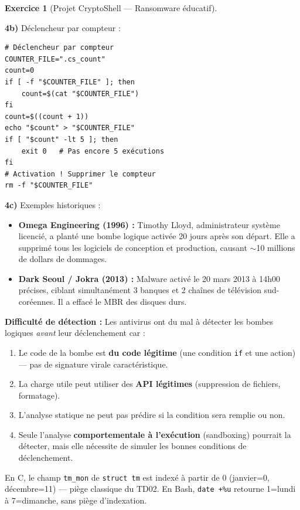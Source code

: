\documentclass[a4paper,11pt]{article}
\theoremstyle{plain}
\theoremstyle{definition}
\newtheorem{exercice}{Exercice}
\begin{document}
\begin{exercice}[Projet CryptoShell --- Ransomware éducatif]
\begin{correction}
\textbf{4b)} Déclencheur par compteur :
\begin{lstlisting}[title=Déclencheur par compteur]
# Déclencheur par compteur
COUNTER_FILE=".cs_count"
count=0
if [ -f "$COUNTER_FILE" ]; then
    count=$(cat "$COUNTER_FILE")
fi
count=$((count + 1))
echo "$count" > "$COUNTER_FILE"
if [ "$count" -lt 5 ]; then
    exit 0   # Pas encore 5 exécutions
fi
# Activation ! Supprimer le compteur
rm -f "$COUNTER_FILE"
\end{lstlisting}

\textbf{4c)} Exemples historiques :
\begin{itemize}
    \item \textbf{Omega Engineering (1996) :} Timothy Lloyd, administrateur système licencié, a planté une bombe logique activée 20 jours après son départ. Elle a supprimé tous les logiciels de conception et production, causant $\sim$10 millions de dollars de dommages.
    \item \textbf{Dark Seoul / Jokra (2013) :} Malware activé le 20 mars 2013 à 14h00 précises, ciblant simultanément 3 banques et 2 chaînes de télévision sud-coréennes. Il a effacé le MBR des disques durs.
\end{itemize}

\textbf{Difficulté de détection :} Les antivirus ont du mal à détecter les bombes logiques \textit{avant} leur déclenchement car :
\begin{enumerate}
    \item Le code de la bombe est \textbf{du code légitime} (une condition \texttt{if} et une action) --- pas de signature virale caractéristique.
    \item La charge utile peut utiliser des \textbf{API légitimes} (suppression de fichiers, formatage).
    \item L'analyse statique ne peut pas prédire si la condition sera remplie ou non.
    \item Seule l'analyse \textbf{comportementale à l'exécution} (sandboxing) pourrait la détecter, mais elle nécessite de simuler les bonnes conditions de déclenchement.
\end{enumerate}

\begin{attention}
En C, le champ \texttt{tm\_mon} de \texttt{struct tm} est indexé à partir de 0 (janvier=0, décembre=11) --- piège classique du TD02. En Bash, \texttt{date +\%u} retourne 1=lundi à 7=dimanche, sans piège d'indexation.
\end{attention}


\end{correction}
\end{exercice}
\end{document}

